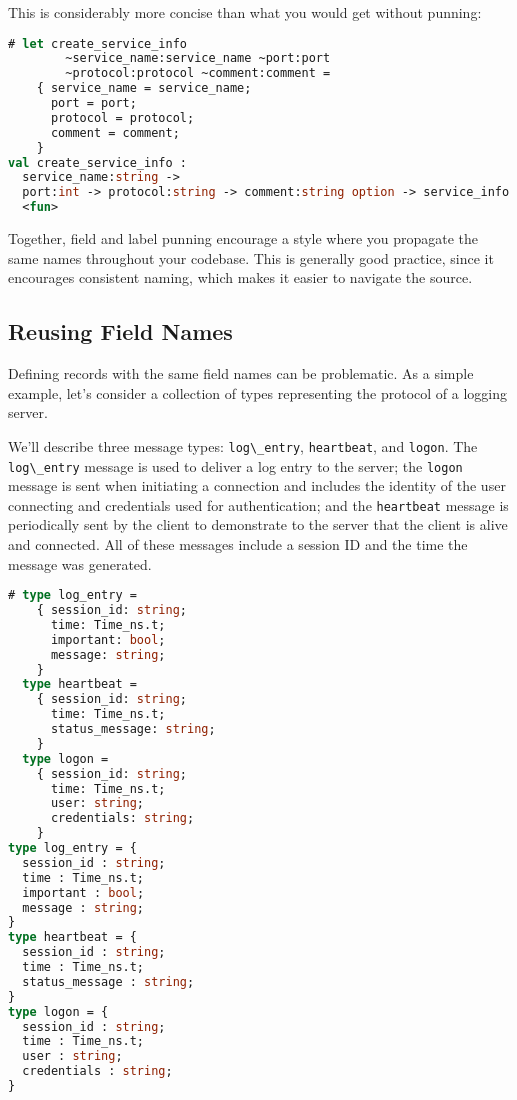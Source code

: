 This is considerably more concise than what you would get without
punning:

\begin{lstlisting}[language=Caml]
# let create_service_info
        ~service_name:service_name ~port:port
        ~protocol:protocol ~comment:comment =
    { service_name = service_name;
      port = port;
      protocol = protocol;
      comment = comment;
    }
val create_service_info :
  service_name:string ->
  port:int -> protocol:string -> comment:string option -> service_info =
  <fun>
\end{lstlisting}

Together, field and label punning encourage a style where you propagate
the same names throughout your codebase. This is generally good
practice, since it encourages consistent naming, which makes it easier
to navigate the source.

\hypertarget{reusing-field-names}{%
\subsection{Reusing Field Names}\label{reusing-field-names}}

Defining records with the same field names can be problematic. As a
simple example, let's consider a collection of types representing the
protocol of a logging server.

We'll describe three message types:
\passthrough{\lstinline!log\_entry!},
\passthrough{\lstinline!heartbeat!}, and
\passthrough{\lstinline!logon!}. The
\passthrough{\lstinline!log\_entry!} message is used to deliver a log
entry to the server; the \passthrough{\lstinline!logon!} message is sent
when initiating a connection and includes the identity of the user
connecting and credentials used for authentication; and the
\passthrough{\lstinline!heartbeat!} message is periodically sent by the
client to demonstrate to the server that the client is alive and
connected. All of these messages include a session ID and the time the
message was generated.

\begin{lstlisting}[language=Caml]
# type log_entry =
    { session_id: string;
      time: Time_ns.t;
      important: bool;
      message: string;
    }
  type heartbeat =
    { session_id: string;
      time: Time_ns.t;
      status_message: string;
    }
  type logon =
    { session_id: string;
      time: Time_ns.t;
      user: string;
      credentials: string;
    }
type log_entry = {
  session_id : string;
  time : Time_ns.t;
  important : bool;
  message : string;
}
type heartbeat = {
  session_id : string;
  time : Time_ns.t;
  status_message : string;
}
type logon = {
  session_id : string;
  time : Time_ns.t;
  user : string;
  credentials : string;
}
\end{lstlisting}

